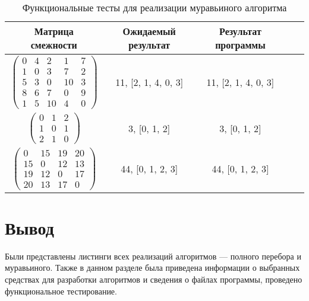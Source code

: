 \begin{center}
	\captionsetup{justification=raggedright,singlelinecheck=off}
	\begin{longtable}[c]{|c|c|c|c|c|}
		\caption{Функциональные тесты для реализации муравьиного алгоритма\label{tbl:functional_test_ants}} \\ \hline
		Матрица смежности & Ожидаемый результат & Результат программы \\
		\hline
		$ \begin{pmatrix}
			0 &  4 &  2 &  1 & 7 \\
			1 &  0 &  3 &  7 & 2 \\
			5 &  3 &  0 & 10 & 3 \\
			8 &  6 & 7 &  0 & 9 \\
			1 &  5 &  10 &  4 & 0
		\end{pmatrix}$ &
		11, [2, 1, 4, 0, 3] &
		11, [2, 1, 4, 0, 3] \\
		
		$ \begin{pmatrix}
			0 & 1 & 2 \\
			1 & 0 & 1 \\
			2 & 1 & 0
		\end{pmatrix}$ &
		3, [0, 1, 2] &
		3, [0, 1, 2] \\
		
		$ \begin{pmatrix}
			0 & 15 & 19 & 20 \\
			15 &  0 & 12 & 13 \\
			19 & 12 &  0 & 17 \\
			20 & 13 & 17 &  0
		\end{pmatrix}$ &
		44, [0, 1, 2, 3] &
		44, [0, 1, 2, 3] \\
		\hline
	\end{longtable}
\end{center}

\section*{Вывод}

Были представлены листинги всех реализаций алгоритмов --- полного перебора и муравьиного.
Также в данном разделе была приведена информации о выбранных средствах для разработки алгоритмов и сведения о файлах программы, проведено функциональное тестирование.